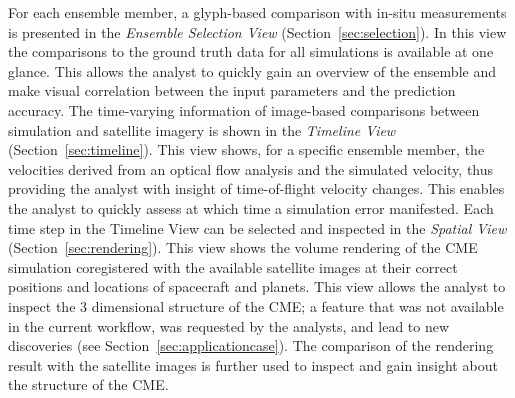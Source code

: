 \documentclass[journal]{vgtc}                %
\begin{document}
For each ensemble member, a glyph-based comparison with in-situ measurements is presented in the \emph{Ensemble Selection View} (Section~\ref{sec:selection}). In this view the comparisons to the ground truth data for all simulations is available at one glance. This allows the analyst to quickly gain an overview of the ensemble and make visual correlation between the input parameters and the prediction accuracy. The time-varying information of image-based comparisons between simulation and satellite imagery is shown in the \emph{Timeline View} (Section~\ref{sec:timeline}). This view shows, for a specific ensemble member, the velocities derived from an optical flow analysis and the simulated velocity, thus providing the analyst with insight of time-of-flight velocity changes. This enables the analyst to quickly assess at which time a simulation error manifested. Each time step in the Timeline View can be selected and inspected in the \emph{Spatial View} (Section~\ref{sec:rendering}). This view shows the volume rendering of the CME simulation coregistered with the available satellite images at their correct positions and locations of spacecraft and planets. This view allows the analyst to inspect the 3 dimensional structure of the CME; a feature that was not available in the current workflow, was requested by the analysts, and lead to new discoveries (see Section~\ref{sec:applicationcase}). The comparison of the rendering result with the satellite images is further used to inspect and gain insight about the structure of the CME.

\end{document}
